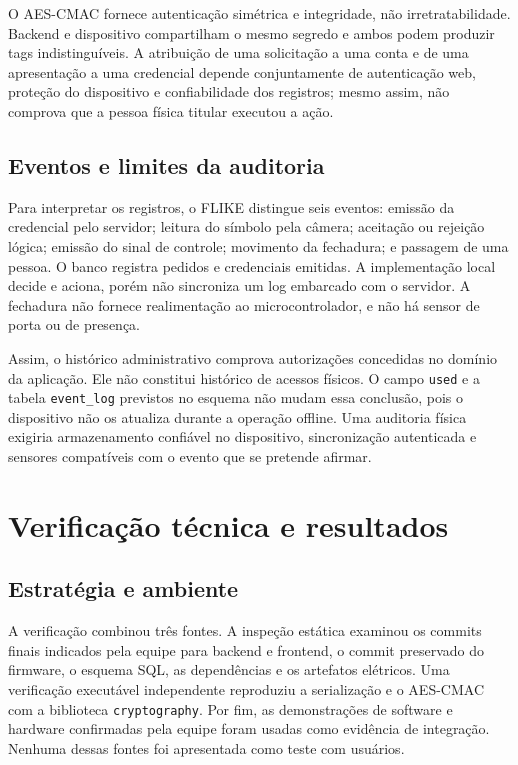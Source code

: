 O AES-CMAC fornece autenticação simétrica e integridade, não irretratabilidade. Backend e dispositivo compartilham o mesmo segredo e ambos podem produzir tags indistinguíveis. A atribuição de uma solicitação a uma conta e de uma apresentação a uma credencial depende conjuntamente de autenticação web, proteção do dispositivo e confiabilidade dos registros; mesmo assim, não comprova que a pessoa física titular executou a ação.

\subsection{Eventos e limites da auditoria}

Para interpretar os registros, o FLIKE distingue seis eventos: emissão da credencial pelo servidor; leitura do símbolo pela câmera; aceitação ou rejeição lógica; emissão do sinal de controle; movimento da fechadura; e passagem de uma pessoa. O banco registra pedidos e credenciais emitidas. A implementação local decide e aciona, porém não sincroniza um log embarcado com o servidor. A fechadura não fornece realimentação ao microcontrolador, e não há sensor de porta ou de presença.

Assim, o histórico administrativo comprova autorizações concedidas no domínio da aplicação. Ele não constitui histórico de acessos físicos. O campo \texttt{used} e a tabela \texttt{event\_log} previstos no esquema não mudam essa conclusão, pois o dispositivo não os atualiza durante a operação offline. Uma auditoria física exigiria armazenamento confiável no dispositivo, sincronização autenticada e sensores compatíveis com o evento que se pretende afirmar.

\section{Verificação técnica e resultados}

\subsection{Estratégia e ambiente}

A verificação combinou três fontes. A inspeção estática examinou os commits finais indicados pela equipe para backend e frontend, o commit preservado do firmware, o esquema SQL, as dependências e os artefatos elétricos. Uma verificação executável independente reproduziu a serialização e o AES-CMAC com a biblioteca \texttt{cryptography}. Por fim, as demonstrações de software e hardware confirmadas pela equipe foram usadas como evidência de integração. Nenhuma dessas fontes foi apresentada como teste com usuários.


